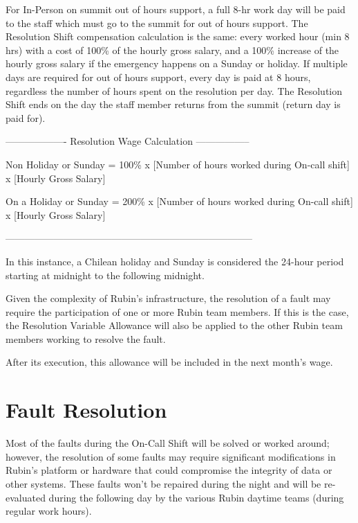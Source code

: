 For In-Person on summit out of hours support, a full 8-hr work day will be paid to the staff which must go to the summit for out of hours support.  The Resolution Shift compensation calculation is the same:  every worked hour (min 8 hrs) with a cost of 100\% of the hourly gross salary, and a 100\% increase of the hourly gross salary if the emergency happens on a Sunday or holiday.  If multiple days are required for out of hours support, every day is paid at 8 hours, regardless the number of hours spent on the resolution per day.  The Resolution Shift ends on the day the staff member returns from the summit (return day is paid for).

\begin{center} -------------------  Resolution Wage Calculation ----------------- \end{center}
Non Holiday or Sunday = 100\% x [Number of hours worked during On-call shift] x [Hourly Gross Salary]

\par
On a Holiday or Sunday = 200\% x [Number of hours worked during On-call shift] x [Hourly Gross Salary]
\begin{center} ----------------------------------------------------------------------------- \end{center}


In this instance, a Chilean holiday and Sunday is considered the 24-hour period starting at midnight to the following midnight.

Given the complexity of Rubin's infrastructure, the resolution of a fault may require the participation of one or more Rubin team members. If this is the case, the Resolution Variable Allowance will also be applied to the other Rubin team members working to resolve the fault.

After its execution, this allowance will be included in the next month's wage.


\section{Fault Resolution}

Most of the faults during the On-Call Shift will be solved or worked around; however, the resolution of some faults may require significant modifications in Rubin's platform or hardware that could compromise the integrity of data or other systems. These faults won't be repaired during the night and will be re-evaluated during the following day by the various Rubin daytime teams (during regular work hours).


